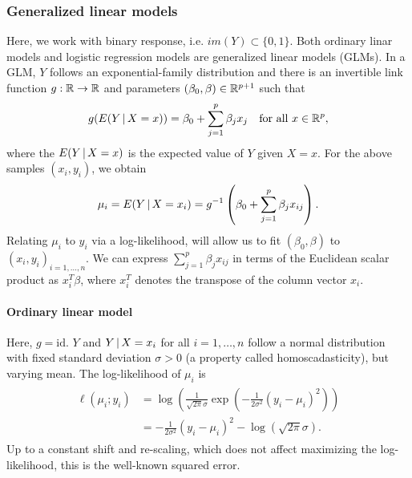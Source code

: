 \subsubsection{Generalized linear models}\label{subsubsec:glm}

Here, we work with binary response, i.e. $im(Y) \subset \{0, 1\}$. Both ordinary 
linar models and logistic regression models are generalized linear models (GLMs). In 
a GLM, $Y$ follows an exponential-family distribution and there is an invertible link function 
$g: \mathbb{R} \to \mathbb{R}$ and parameters $(\beta_0, \beta) \in \mathbb{R}^{p+1}$ such that
\begin{align}
    g(E(Y \,|\, X = x)) = \beta_0 + \sum_{j=1}^p \beta_j x_j \quad \text{for all } x \in \mathbb{R}^p,
\end{align}
where the $E(Y \,|\, X = x)$ is the expected value of $Y$ given $X = x$. For the above samples 
$(x_i, y_i)$, we obtain
\begin{align}
    \mu_i = E(Y \,|\, X = x_i) = g^{-1}\left(\beta_0 + \sum_{j=1}^p \beta_j x_{ij}\right).
\end{align}
Relating $\mu_i$ to $y_i$ via a log-likelihood, will allow us to fit $(\beta_0, \beta)$ to 
$(x_i, y_i)_{i = 1, \ldots, n}$. We can express $\sum_{j=1}^p \beta_j x_{ij}$ in terms of the 
Euclidean scalar product as $x_i^T \beta$, where $x_i^T$ denotes the transpose of the column vector 
$x_i$.

\paragraph{Ordinary linear model}
Here, $g = \text{id}$. $Y$ and $Y \,|\, X = x_i$ for all $i = 1, \ldots, n$ follow a normal
distribution with fixed standard deviation $\sigma > 0$ (a property called homoscadasticity), but 
varying mean. The log-likelihood of $\mu_i$ is
\begin{align}
\begin{split}
    \ell(\mu_i; y_i) &= \log\left( \frac{1}{\sqrt{2\pi}\sigma} 
        \exp \left( -\frac{1}{2\sigma^2}(y_i - \mu_i)^2 \right) \right) \\
    &= -\frac{1}{2\sigma^2}(y_i - \mu_i)^2 - \log \left( \sqrt{2\pi}\sigma \right).
\end{split}
\end{align}
Up to a constant shift and re-scaling, which does not affect maximizing the log-likelihood, this
is the well-known squared error.

